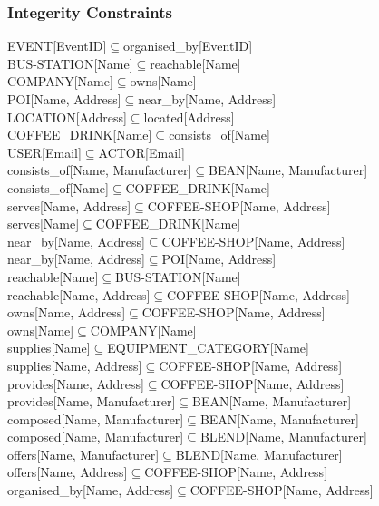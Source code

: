 \subsubsection{Integerity Constraints}
EVENT[EventID]$\subseteq$organised\_by[EventID]\\
BUS-STATION[Name]$\subseteq$reachable[Name]\\
COMPANY[Name]$\subseteq$owns[Name]\\
POI[Name, Address]$\subseteq$near\_by[Name, Address]\\
LOCATION[Address]$\subseteq$located[Address]\\
COFFEE\_DRINK[Name]$\subseteq$consists\_of[Name]\\
USER[Email]$\subseteq$ACTOR[Email]\\
consists\_of[Name, Manufacturer]$\subseteq$BEAN[Name, Manufacturer]\\
consists\_of[Name]$\subseteq$COFFEE\_DRINK[Name]\\
serves[Name, Address]$\subseteq$COFFEE-SHOP[Name, Address]\\
serves[Name]$\subseteq$COFFEE\_DRINK[Name]\\
near\_by[Name, Address]$\subseteq$COFFEE-SHOP[Name, Address]\\
near\_by[Name, Address]$\subseteq$POI[Name, Address]\\
reachable[Name]$\subseteq$BUS-STATION[Name]\\
reachable[Name, Address]$\subseteq$COFFEE-SHOP[Name, Address]\\
owns[Name, Address]$\subseteq$COFFEE-SHOP[Name, Address]\\
owns[Name]$\subseteq$COMPANY[Name]\\
supplies[Name]$\subseteq$EQUIPMENT\_CATEGORY[Name]\\
supplies[Name, Address]$\subseteq$COFFEE-SHOP[Name, Address]\\
provides[Name, Address]$\subseteq$COFFEE-SHOP[Name, Address]\\
provides[Name, Manufacturer]$\subseteq$BEAN[Name, Manufacturer]\\
composed[Name, Manufacturer]$\subseteq$BEAN[Name, Manufacturer]\\
composed[Name, Manufacturer]$\subseteq$BLEND[Name, Manufacturer]\\
offers[Name, Manufacturer]$\subseteq$BLEND[Name, Manufacturer]\\
offers[Name, Address]$\subseteq$COFFEE-SHOP[Name, Address]\\
organised\_by[Name, Address]$\subseteq$COFFEE-SHOP[Name, Address]\\
